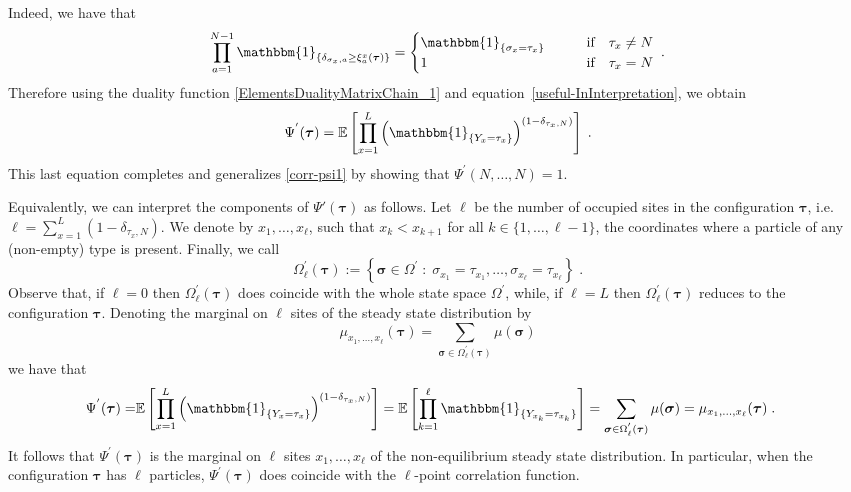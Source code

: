 \documentclass[10pt]{article}
\numberwithin{equation}{section}
\numberwithin{equation}{subsection}
\newcommand{\dt}{\;.}
\begin{document}
Indeed, we have that 
\begin{equation}
	\prod_{a=1}^{N-1}\mathbbm{1}_{\{\delta_{\sigma_{x},a}\geq\xi_{a}^{x}(\bm{\tau})\}}=\begin{cases}
			\mathbbm{1}_{\{\sigma_{x}=\tau_{x}\}}\qquad &\text{if}\quad \tau_{x}\neq N\\
			1\qquad  &\text{if}\quad \tau_{x}= N
			\end{cases}\dt
\end{equation}
 Therefore using the duality function \eqref{ElementsDualityMatrixChain_1} and equation~\ref{useful-InInterpretation}, we obtain 
 	\begin{equation}\label{interpretation-PsiP}
 	\Psi^{'}(\bm{\tau})=\mathbb{E}\left[\prod_{x=1}^{L}\left(\mathbbm{1}_{\{Y_{x}=\tau_{x}\}} \right)^{(1-\delta_{\tau_{x},N})}\right]\dt
 \end{equation} 
 This last equation completes and generalizes \eqref{corr-psi1} by showing that $\Psi^{'}(N,\ldots,N) =1$.
 
 Equivalently, we can interpret the components of $\Psi'(\bm{\tau})$ as follows.
 Let $\ell$ be the number of occupied sites in the configuration $\bm{\tau}$, i.e.  $\ell=\sum_{x=1}^{L}(1-\delta_{\tau_{x},N})$. We denote by $x_{1},\ldots,x_{\ell}$, such that $x_{k}<x_{k+1}$ for all $k\in \{1,\ldots,\ell-1\}$, the coordinates where a particle of any (non-empty) type is present. Finally, we call 
 \begin{equation}
 	\Omega_{\ell}^{'}(\bm{\tau}):=\left\{\bm{\sigma}\in \Omega^{'}\;:\; \sigma_{x_{1}}=\tau_{x_{1}},\ldots,\sigma_{x_{\ell}}=\tau_{x_{\ell}}\right\}\dt
 \end{equation} 
Observe that, if $\ell=0$ then $\Omega_{\ell}^{'}(\bm{\tau})$ does coincide with the whole state space $\Omega^{'}$, while, if $\ell=L$ then $\Omega_{\ell}^{'}(\bm{\tau})$ reduces to the configuration $\bm{\tau}$. Denoting the marginal on $\ell$ sites of the steady state distribution by 
\begin{equation}
	\mu_{x_{1},\ldots,x_{\ell}}(\bm{\tau})=\sum_{\bm{\sigma}\in \Omega_{\ell}^{'}(\bm{\tau})}\mu(\bm{\sigma})
\end{equation}
we have that 
\begin{align}
	\Psi^{'}(\bm{\tau})=&\mathbb{E}\left[\prod_{x=1}^{L}\left(\mathbbm{1}_{\{Y_{x}=\tau_{x}\}} \right)^{(1-\delta_{\tau_{x},N})}\right]=\mathbb{E}\left[\prod_{k=1}^{\ell}\mathbbm{1}_{\{Y_{x_{k}}=\tau_{x_{k}}\}}\right]=\sum_{\bm{\sigma}\in \Omega_{\ell}^{'}(\bm{\tau})}\mu(\bm{\sigma})=\mu_{x_{1},\ldots,x_{\ell}}(\bm{\tau})\dt
\end{align} 
It follows that $\Psi^{'}(\bm{\tau})$ is the marginal on $\ell$ sites $x_{1},\ldots,x_{\ell}$ of the non-equilibrium steady state distribution. In particular, when the configuration $\bm{\tau}$ has $\ell$ particles, $\Psi^{'}(\bm{\tau})$ does coincide with the $\ell$-point correlation function. 
\end{document}
